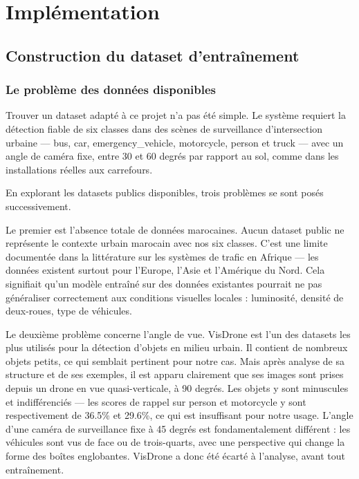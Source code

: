 \chapter{Implémentation}
\label{ch:implementation}

\section{Construction du dataset d'entraînement}

\subsection{Le problème des données disponibles}

Trouver un dataset adapté à ce projet
n'a pas été simple. Le système requiert
la détection fiable de six classes dans
des scènes de surveillance d'intersection
urbaine — bus, car, emergency\_vehicle,
motorcycle, person et truck — avec un
angle de caméra fixe, entre 30 et 60
degrés par rapport au sol, comme dans
les installations réelles aux carrefours.

En explorant les datasets publics disponibles,
trois problèmes se sont posés successivement.

Le premier est l'absence totale de données
marocaines. Aucun dataset public ne représente
le contexte urbain marocain avec nos six
classes. C'est une limite documentée dans
la littérature sur les systèmes de trafic
en Afrique — les données existent surtout
pour l'Europe, l'Asie et l'Amérique du Nord.
Cela signifiait qu'un modèle entraîné sur
des données existantes pourrait ne pas
généraliser correctement aux conditions
visuelles locales : luminosité, densité
de deux-roues, type de véhicules.

Le deuxième problème concerne l'angle de
vue. VisDrone est l'un des datasets les plus
utilisés pour la détection d'objets en milieu
urbain. Il contient de nombreux objets petits,
ce qui semblait pertinent pour notre cas.
Mais après analyse de sa structure et de ses
exemples, il est apparu clairement que ses
images sont prises depuis un drone en vue
quasi-verticale, à 90 degrés. Les objets y
sont minuscules et indifférenciés — les scores
de rappel sur person et motorcycle y sont
respectivement de 36.5\% et 29.6\%, ce qui
est insuffisant pour notre usage. L'angle
d'une caméra de surveillance fixe à
45 degrés est fondamentalement différent :
les véhicules sont vus de face ou de
trois-quarts, avec une perspective qui
change la forme des boîtes englobantes.
VisDrone a donc été écarté à l'analyse,
avant tout entraînement.

